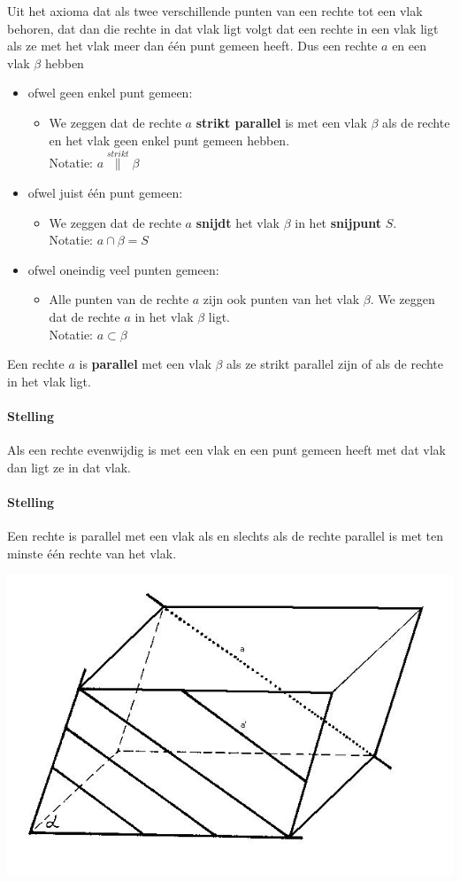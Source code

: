 \documentclass[12pt,twoside]{article}
\begin{document}
Uit het axioma dat als twee verschillende punten van een rechte tot een vlak behoren, dat dan die rechte in dat vlak ligt volgt dat een rechte in een vlak ligt als ze met het vlak meer dan één punt gemeen heeft. Dus een rechte $a$ en een vlak $\beta$ hebben
\begin{itemize}
  \item ofwel geen enkel punt gemeen:
  \begin{itemize}
    \item We zeggen dat de rechte $a$ {\bf strikt parallel} is met een vlak $\beta$ als de rechte en het vlak geen enkel punt gemeen hebben.\\
    Notatie: $a \overset{strikt}{\parallel} \beta$
  \end{itemize}
  \item ofwel juist één punt gemeen:
  \begin{itemize}
    \item We zeggen dat de rechte $a$ {\bf snijdt} het vlak $\beta$ in het {\bf snijpunt} $S$.\\
    Notatie: $a\cap \beta = S$ 
  \end{itemize}
  \item ofwel oneindig veel punten gemeen:
  \begin{itemize}
    \item Alle punten van de rechte $a$ zijn ook punten van het vlak $\beta$. We zeggen dat de rechte $a$ in het vlak $\beta$ ligt.\\
    Notatie: $a\subset\beta$
  \end{itemize}
\end{itemize}

Een rechte $a$ is {\bf parallel} met een vlak $\beta$ als ze strikt parallel zijn of als de rechte in het vlak ligt.

\paragraph*{Stelling}
Als een rechte evenwijdig is met een vlak en een punt gemeen heeft met dat vlak dan ligt ze in dat vlak.

\paragraph*{Stelling}
Een rechte is parallel met een vlak als en slechts als de rechte parallel is met ten minste één rechte van het vlak.
\begin{center}
  \includegraphics[width=.5\textwidth]{stelling_3}
\end{center}
\end{document}
